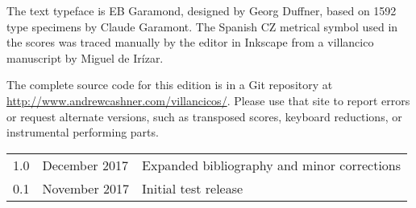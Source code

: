 The text typeface is EB Garamond, designed by Georg Duffner, based on 1592 type 
specimens by Claude Garamont.
The Spanish CZ metrical symbol used in the scores was traced manually by the
editor in Inkscape from a villancico manuscript by Miguel de Irízar.

The complete source code for this edition is in a Git repository at
\url{http://www.andrewcashner.com/villancicos/}.
Please use that site to report errors or request alternate versions, such as
transposed scores, keyboard reductions, or instrumental performing parts.


\begin{tabular}{rll}
    1.0 & December 2017 & Expanded bibliography and minor corrections\\
    0.1 & November 2017 & Initial test release\\
\end{tabular}
